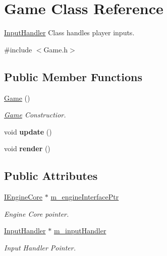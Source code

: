 \hypertarget{class_game}{}\section{Game Class Reference}
\label{class_game}


\mbox{\hyperlink{struct_input_handler}{Input\+Handler}} Class handles player inputs.  




{\ttfamily \#include $<$Game.\+h$>$}

\subsection*{Public Member Functions}
\begin{DoxyCompactItemize}
\item 
\mbox{\label{class_game_ad59df6562a58a614fda24622d3715b65}} 
\mbox{\hyperlink{class_game_ad59df6562a58a614fda24622d3715b65}{Game}} ()
\begin{DoxyCompactList}\small\item\em \mbox{\hyperlink{class_game}{Game}} Constructior. \end{DoxyCompactList}\item 
\mbox{\label{class_game_a79df6376b332d63c9eca0dcee30305c3}} 
void {\bfseries update} ()
\item 
\mbox{\label{class_game_a15ddd769261d923827a3cdf41499c843}} 
void {\bfseries render} ()
\end{DoxyCompactItemize}
\subsection*{Public Attributes}
\begin{DoxyCompactItemize}
\item 
\mbox{\label{class_game_ad01d32edc479a3edc79e5a3d7b4281d2}} 
\mbox{\hyperlink{class_i_engine_core}{I\+Engine\+Core}} $\ast$ \mbox{\hyperlink{class_game_ad01d32edc479a3edc79e5a3d7b4281d2}{m\+\_\+engine\+Interface\+Ptr}}
\begin{DoxyCompactList}\small\item\em Engine Core pointer. \end{DoxyCompactList}\item 
\mbox{\label{class_game_a001f55f492c3fbafe8cf27eb04df293c}} 
\mbox{\hyperlink{struct_input_handler}{Input\+Handler}} $\ast$ \mbox{\hyperlink{class_game_a001f55f492c3fbafe8cf27eb04df293c}{m\+\_\+input\+Handler}}
\begin{DoxyCompactList}\small\item\em Input Handler Pointer. \end{DoxyCompactList}\end{DoxyCompactItemize}


